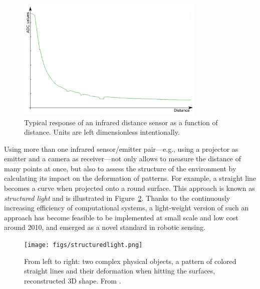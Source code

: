 \begin{figure}
	\centering
		\includegraphics[width=0.8\textwidth]{figs/epuckirsensor.png}
	\caption{Typical response of an infrared distance sensor as a function of distance. Units are left dimensionless intentionally.}
	\label{fig:epuckir}
\end{figure}

Using more than one infrared sensor/emitter pair---e.g., using a projector as emitter and a camera as receiver---not only allows to measure the distance of many points at once, but also to assess the structure of the environment by calculating its impact on the deformation of patterns. For example, a straight line becomes a curve when projected onto a round surface. This approach is known as \textsl{structured light} and is illustrated in Figure~\ref{fig:struclight}.
Thanks to the continuously increasing efficiency of computational systems, a light-weight version of such an approach has become feasible to be implemented at small scale and low cost around 2010, and emerged as a novel standard in robotic sensing.

\begin{figure}
	\centering
		\texttt{[image: figs/structuredlight.png]}
	\caption{From left to right: two complex physical objects, a pattern of colored straight lines and their deformation when hitting the surfaces, reconstructed 3D shape. From \protect\cite{zhang2002rapid}.}
	\label{fig:struclight}
\end{figure}

